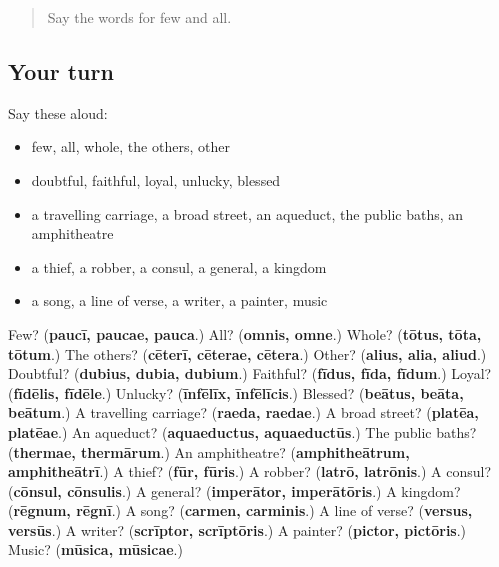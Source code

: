 \label{lesson:LA-R246-second-pass-words-from-chapters-242-246}



\begin{quote}
Say the words for few and all.
\end{quote}

\subsection*{Your turn}
Say these aloud:

\begin{itemize}
\raggedright
  \item few, all, whole, the others, other
  \item doubtful, faithful, loyal, unlucky, blessed
  \item a travelling carriage, a broad street, an aqueduct, the public baths, an amphitheatre
  \item a thief, a robber, a consul, a general, a kingdom
  \item a song, a line of verse, a writer, a painter, music
\end{itemize}

\begin{tcolorbox}[breakable,colback=teal!4,colframe=teal!35!black,title={Before you move on}]
Few? (\textbf{paucī, paucae, pauca}.) All? (\textbf{omnis, omne}.) Whole? (\textbf{tōtus, tōta, tōtum}.) The others? (\textbf{cēterī, cēterae, cētera}.) Other? (\textbf{alius, alia, aliud}.) Doubtful? (\textbf{dubius, dubia, dubium}.) Faithful? (\textbf{fīdus, fīda, fīdum}.) Loyal? (\textbf{fīdēlis, fīdēle}.) Unlucky? (\textbf{īnfēlīx, īnfēlīcis}.) Blessed? (\textbf{beātus, beāta, beātum}.) A travelling carriage? (\textbf{raeda, raedae}.) A broad street? (\textbf{platēa, platēae}.) An aqueduct? (\textbf{aquaeductus, aquaeductūs}.) The public baths? (\textbf{thermae, thermārum}.) An amphitheatre? (\textbf{amphitheātrum, amphitheātrī}.) A thief? (\textbf{fūr, fūris}.) A robber? (\textbf{latrō, latrōnis}.) A consul? (\textbf{cōnsul, cōnsulis}.) A general? (\textbf{imperātor, imperātōris}.) A kingdom? (\textbf{rēgnum, rēgnī}.) A song? (\textbf{carmen, carminis}.) A line of verse? (\textbf{versus, versūs}.) A writer? (\textbf{scrīptor, scrīptōris}.) A painter? (\textbf{pictor, pictōris}.) Music? (\textbf{mūsica, mūsicae}.)
\end{tcolorbox}
